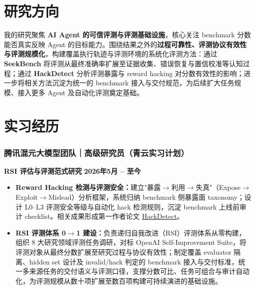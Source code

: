 \documentclass[10pt,a4paper]{article}
\begin{document}
\section*{\color{sectioncolor}研究方向}
\noindent 我的研究聚焦 \textbf{AI Agent 的可信评测与评测基础设施}，核心关注 benchmark 分数能否真实反映 Agent 的目标能力。围绕结果之外的\textbf{过程可靠性、评测协议有效性与评测规模化}，构建覆盖执行轨迹与评测环境的系统化评测方法：通过 \textbf{SeekBench} 将评测从最终准确率扩展至证据收集、错误恢复与置信校准等认知过程；通过 \textbf{HackDetect} 分析评测暴露与 reward hacking 对分数有效性的影响；进一步将相关方法沉淀为统一的 benchmark 接入与交付规范，为后续扩大任务规模、接入更多 Agent 及自动化评测奠定基础。

\section*{\color{sectioncolor}实习经历}
    \subsubsection*{\color{itemcolor}腾讯混元大模型团队｜高级研究员（青云实习计划）}
    \noindent\textbf{\color{sectioncolor}RSI 评估与评测范式研究} \hfill \color{accentcolor}\textbf{2026年5月 – 至今}
    \begin{itemize}[leftmargin=*, label=\textcolor{accentcolor}{\textbullet}, itemsep=0.2em]
        \item \textbf{Reward Hacking 检测与评测安全：}建立"暴露$\rightarrow$利用$\rightarrow$失真"（Expose$\rightarrow$Exploit$\rightarrow$Mislead）分析框架，系统归纳 benchmark 侧暴露面 taxonomy；设计 L0--L3 评测安全等级与自动化 hack 检测规则，沉淀 benchmark 上线前审计 checklist。相关成果形成第一作者论文 \href{https://arxiv.org/abs/2607.22368}{\color{linkcolor}HackDetect}。
        \item \textbf{RSI 评测体系 0$\rightarrow$1 建设：}负责递归自我改进（RSI）评测体系从零构建，组织 8 大研究领域评测任务调研，对标 OpenAI Self-Improvement Suite，将评测对象从最终分数扩展至研究过程与协议有效性；制定覆盖 evaluator 隔离、hidden set 设计及 invalid/hack 判定的 benchmark 接入与交付标准，统一多来源任务的交付语义与评测口径，支撑分数可比、任务可组合与审计自动化，为评测规模从数十项扩展至数百项构建可持续演进的基础设施。
    \end{itemize}
\end{document}
